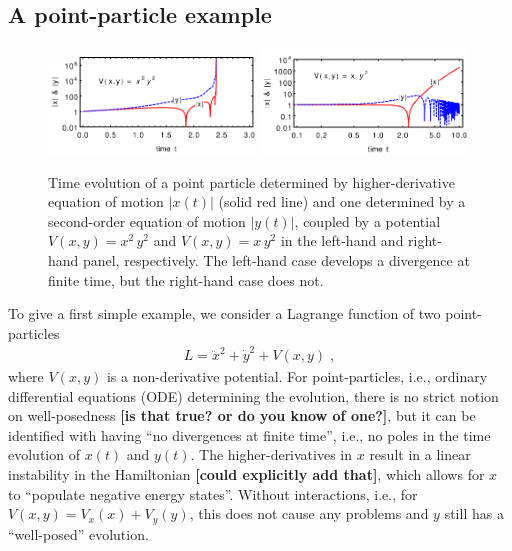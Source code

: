 \documentclass[a4paper,oneside,openany,11pt]{memoir}
\numberwithin{equation}{section} %
\newcommand{\aaron}[1]{{\color{OliveGreen} #1}}
\begin{document}
\subsection{A point-particle example}
%
\begin{figure}
  \centering
  \includegraphics[width=0.49\textwidth]{pointParticle_divergenceAtFiniteTime.pdf}
  \hfill
  \includegraphics[width=0.49\textwidth]{pointParticle_noDivergenceAtFiniteTime.pdf}
  \caption{\label{fig:simpleExample}
  Time evolution of a point particle determined by higher-derivative equation of motion $|x(t)|$ (solid red line) and one determined by a second-order equation of motion $|y(t)|$, coupled by a potential $V(x,y) = x^2\,y^2$ and $V(x,y) = x\,y^2$ in the left-hand and right-hand panel, respectively. The left-hand case develops a divergence at finite time, but the right-hand case does not.}
\end{figure}
%
To give a first simple example, we consider a Lagrange function of two point-particles
\begin{align}
    L = \ddot{x}^2 + \dot{y}^2 + V(x,y)\;,
\end{align}
where $V(x,y)$ is a non-derivative potential. For point-particles, i.e., ordinary differential equations (ODE) determining the evolution, there is no strict notion on well-posedness \textbf{\aaron{[is that true? or do you know of one?]}}, but it can be identified with having ``no divergences at finite time'', i.e., no poles in the time evolution of $x(t)$ and $y(t)$. The higher-derivatives in $x$ result in a linear instability in the Hamiltonian \textbf{\aaron{[could explicitly add that]}}, which allows for $x$ to ``populate negative energy states''. Without interactions, i.e., for $V(x,y)=V_x(x) + V_y(y)$, this does not cause any problems and $y$ still has a ``well-posed'' evolution.
\\
\end{document}
